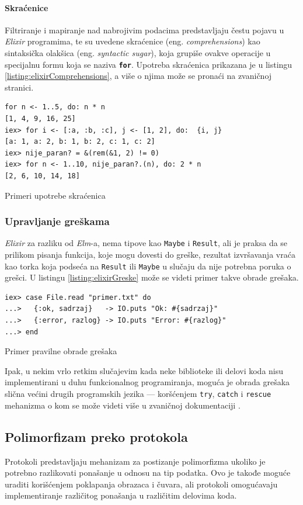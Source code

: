 \documentclass[12pt,oneside]{memoir}
\begin{document}
\paragraph{Skraćenice}
Filtriranje i mapiranje nad nabrojivim podacima predstavljaju čestu pojavu u \emph{Elixir} programima,
te su uvedene skraćenice (eng. \emph{comprehensions}) kao sintaksička olakšica (eng. \emph{syntactic sugar}), koja
grupiše ovakve operacije u specijalnu formu koja se naziva \texttt{\textbf{for}}. Upotreba skraćenica
prikazana je u listingu \ref{listing:elixirComprehensions}, a više o njima može se pronaći na zvaničnoj
\cite{elixir} stranici.
\begin{listing}[!ht]
\begin{verbatim}
for n <- 1..5, do: n * n
[1, 4, 9, 16, 25]
iex> for i <- [:a, :b, :c], j <- [1, 2], do:  {i, j}
[a: 1, a: 2, b: 1, b: 2, c: 1, c: 2]
iex> nije_paran? = &(rem(&1, 2) != 0)
iex> for n <- 1..10, nije_paran?.(n), do: 2 * n
[2, 6, 10, 14, 18]
\end{verbatim}
\caption{Primeri upotrebe skraćenica}
\label{listing:elixirComprehensions}
\end{listing}
\subsubsection{Upravljanje greškama}
\emph{Elixir} za razliku od \emph{Elm}-a, nema tipove kao \texttt{Maybe} i \texttt{Result}, ali je praksa
da se prilikom pisanja funkcija, koje mogu dovesti do greške, rezultat izvršavanja vraća kao
torka koja podseća na \texttt{Result} ili \texttt{Maybe} u slučaju da nije potrebna poruka o
grešci. U listingu \ref{listing:elixirGreske} može se videti primer takve obrade grešaka.
\begin{listing}[!ht]
\begin{verbatim}
iex> case File.read "primer.txt" do
...>   {:ok, sadrzaj}   -> IO.puts "Ok: #{sadrzaj}"
...>   {:error, razlog} -> IO.puts "Error: #{razlog}"
...> end
\end{verbatim}
\caption{Primer pravilne obrade grešaka}
\label{listing:elixirGreske}
\end{listing}
Ipak, u nekim vrlo retkim slučajevim kada neke biblioteke ili delovi koda nisu implementirani
u duhu funkcionalnog programiranja, moguća je obrada grešaka slična većini drugih programskih
jezika --- koršćenjem \texttt{try}, \texttt{catch} i \texttt{rescue} mehanizma o kom se može
videti više u zvaničnoj dokumentaciji \cite{elixir}.
\subsection{Polimorfizam preko protokola}
Protokoli predstavljaju mehanizam za postizanje polimorfizma ukoliko je potrebno razlikovati
ponašanje u odnosu na tip podatka. Ovo je takođe moguće uraditi korišćenjem poklapanja
obrazaca i čuvara, ali protokoli omogućavaju implementiranje različitog ponašanja u
različitim delovima koda.
\end{document}
